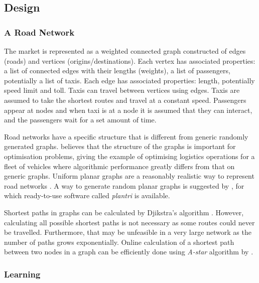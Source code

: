 \subsection{Design}

\subsubsection{A Road Network}
\label{sec:design:network}

The market is represented as a weighted connected graph constructed of edges
(roads) and vertices (origins/destinations). Each vertex has associated
properties: a list of connected edges with their lengths (weights), a list of
passengers, potentially a list of taxis. Each edge has associated properties:
length, potentially speed limit and toll. Taxis can travel between vertices
using edges. Taxis are assumed to take the shortest routes and travel at a
constant speed. Passengers appear at nodes and when taxi is at a node it is
assumed that they can interact, and the passengers wait for a set amount of
time.

Road networks have a specific structure that is different from generic randomly
generated graphs. \textcite{Eisenstat2011graphs+quadtree} believes that the
structure of the graphs is important for optimisation problems, giving the
example of optimising logistics operations for a fleet of vehicles where
algorithmic performance greatly differs from that on generic graphs. Uniform
planar graphs are a reasonably realistic way to represent road networks
\parencite{Eisenstat2011graphs+quadtree, Masucci2009graphs+london}. A way to
generate random planar graphs is suggested by
\textcite{Brinkmann2007graphs+generate}, for which ready-to-use software called
\textit{plantri} is available. 

Shortest paths in graphs can be calculated by Djikstra's algorithm
\parencite{Cormen2009algorithms}. However, calculating all possible shortest
paths is not necessary as some routes could never be travelled. Furthermore,
that may be unfeasible in a very large network as the number of paths grows
exponentially. Online calculation of a shortest path between two nodes in a
graph can be efficiently done using \textit{A-star} algorithm by
\textcite{Hart1968paths}.


\subsubsection{Learning}
\label{sec:design:ai}


